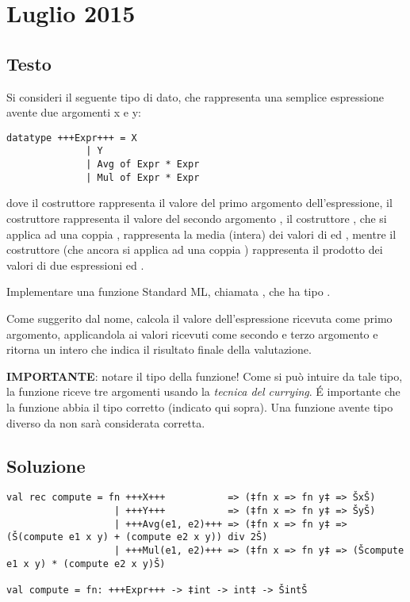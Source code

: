 \section{Luglio 2015}

\subsection{Testo}

Si consideri il seguente tipo di dato, che rappresenta una semplice espressione avente due argomenti x e y:

\begin{lstlisting}[style = SML, caption = {Definizione del tipo di dato \sml{espressione Lambda}}]
datatype +++Expr+++ = X
			  | Y
			  | Avg of Expr * Expr
			  | Mul of Expr * Expr
\end{lstlisting}

dove il costruttore  rappresenta il valore del primo argomento  dell'espressione, %
il costruttore  rappresenta il valore del secondo argomento , %
il costruttore , che si applica ad una coppia , rappresenta la media (intera) dei valori di  ed , %
mentre il costruttore  (che ancora si applica ad una coppia ) rappresenta il prodotto dei valori di due espressioni  ed .

\medskip
Implementare una funzione Standard ML, chiamata , che ha tipo .

\medskip
Come suggerito dal nome,  calcola il valore dell'espressione ricevuta come primo argomento, applicandola ai valori ricevuti come secondo e terzo argomento e ritorna un intero che indica il risultato finale della valutazione.

\medskip
\textbf{IMPORTANTE}: notare il tipo della funzione! Come si può intuire da tale tipo, la funzione riceve tre argomenti usando la \emph{tecnica del currying}. \'E importante che la funzione abbia il tipo corretto (indicato qui sopra). Una funzione avente tipo diverso da  non sarà considerata corretta.

\subsection{Soluzione}

\begin{lstlisting}[style = SML, caption = {Definizione della funzione \sml{compute}}]
val rec compute = fn +++X+++           => (‡fn x => fn y‡ => ŠxŠ)
				   | +++Y+++           => (‡fn x => fn y‡ => ŠyŠ)
				   | +++Avg(e1, e2)+++ => (‡fn x => fn y‡ => (Š(compute e1 x y) + (compute e2 x y)) div 2Š)
				   | +++Mul(e1, e2)+++ => (‡fn x => fn y‡ => (Šcompute e1 x y) * (compute e2 x y)Š)

val compute = fn: +++Expr+++ -> ‡int -> int‡ -> ŠintŠ
\end{lstlisting}

